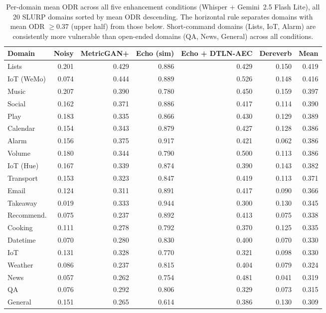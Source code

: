 \begin{table}[t]
  \centering
  \begin{tabular}{lrrrrrr}
    \hline
    \textbf{Domain} & \textbf{Noisy} & \textbf{MetricGAN+} & \textbf{Echo (sim)} & \textbf{Echo + DTLN-AEC} & \textbf{Dereverb} & \textbf{Mean} \\
    \hline
    Lists            & 0.201 & 0.429 & 0.886 & 0.429 & 0.150 & 0.419 \\
    IoT (WeMo)       & 0.074 & 0.444 & 0.889 & 0.526 & 0.148 & 0.416 \\
    Music            & 0.207 & 0.390 & 0.780 & 0.450 & 0.159 & 0.397 \\
    Social           & 0.162 & 0.371 & 0.886 & 0.417 & 0.114 & 0.390 \\
    Play             & 0.183 & 0.335 & 0.866 & 0.430 & 0.129 & 0.389 \\
    Calendar         & 0.154 & 0.343 & 0.879 & 0.427 & 0.128 & 0.386 \\
    Alarm            & 0.156 & 0.375 & 0.917 & 0.421 & 0.062 & 0.386 \\
    Volume           & 0.180 & 0.344 & 0.790 & 0.500 & 0.113 & 0.386 \\
    IoT (Hue)        & 0.167 & 0.339 & 0.874 & 0.390 & 0.143 & 0.382 \\
    Transport        & 0.153 & 0.323 & 0.847 & 0.419 & 0.113 & 0.371 \\
    \hline
    Email            & 0.124 & 0.311 & 0.891 & 0.417 & 0.090 & 0.366 \\
    Takeaway         & 0.019 & 0.333 & 0.944 & 0.300 & 0.130 & 0.345 \\
    Recommend.       & 0.075 & 0.237 & 0.892 & 0.413 & 0.075 & 0.338 \\
    Cooking          & 0.111 & 0.278 & 0.792 & 0.370 & 0.125 & 0.335 \\
    Datetime         & 0.070 & 0.280 & 0.830 & 0.400 & 0.070 & 0.330 \\
    IoT              & 0.131 & 0.328 & 0.770 & 0.321 & 0.098 & 0.330 \\
    Weather          & 0.086 & 0.237 & 0.815 & 0.404 & 0.079 & 0.324 \\
    News             & 0.057 & 0.262 & 0.754 & 0.481 & 0.041 & 0.319 \\
    QA               & 0.076 & 0.292 & 0.806 & 0.329 & 0.073 & 0.315 \\
    General          & 0.151 & 0.265 & 0.614 & 0.386 & 0.130 & 0.309 \\
    \hline
  \end{tabular}
  \caption{Per-domain mean ODR across all five enhancement conditions
    (Whisper + Gemini~2.5 Flash Lite), all 20 SLURP domains sorted by
    mean ODR descending. The horizontal rule separates domains with
    mean ODR $\geq 0.37$ (upper half) from those below. Short-command
    domains (Lists, IoT, Alarm) are consistently more vulnerable than
    open-ended domains (QA, News, General) across all conditions.}
  \label{tab:domain_odr}
\end{table}